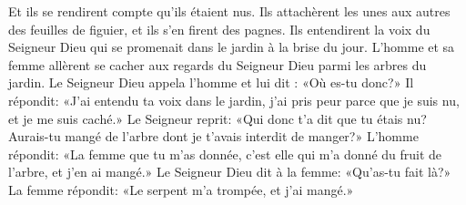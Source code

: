 Et ils se rendirent compte qu’ils étaient nus.
Ils attachèrent les unes aux autres des feuilles de figuier,
	et ils s’en firent des pagnes.
Ils entendirent la voix du Seigneur Dieu
	qui se promenait dans le jardin à la brise du jour.
L’homme et sa femme allèrent se cacher aux regards du Seigneur Dieu
	parmi les arbres du jardin.
Le Seigneur Dieu appela l’homme et lui dit : «Où es-tu donc?»
Il répondit: «J’ai entendu ta voix dans le jardin,
	j’ai pris peur parce que je suis nu, et je me suis caché.»
Le Seigneur reprit: «Qui donc t’a dit que tu étais nu?
	Aurais-tu mangé de l’arbre dont je t’avais interdit de manger?»
L’homme répondit: «La femme que tu m’as donnée,
	c’est elle qui m’a donné du fruit de l’arbre, et j’en ai mangé.»
Le Seigneur Dieu dit à la femme: «Qu’as-tu fait là?»
La femme répondit: «Le serpent m’a trompée, et j’ai mangé.»
